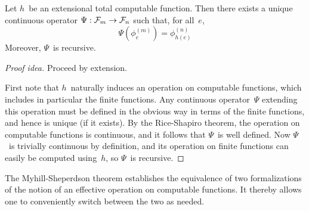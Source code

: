 \begin{thm}
Let \(h\)~be an extensional total computable function. Then there exists a unique continuous operator \(\Psi:\mathcal{F}_m\to\mathcal{F}_n\) such that, for all~\(e\),
\[\Psi(\phi_e^{(m)})=\phi_{h(e)}^{(n)}\]
Moreover, \(\Psi\)~is recursive.
\end{thm}
\begin{proof}[Proof idea]
Proceed by extension.

First note that \(h\)~naturally induces an operation on computable functions, which includes in particular the finite functions. Any continuous operator~\(\Psi\) extending this operation must be defined in the obvious way in terms of the finite functions, and hence is unique (if it exists). By the Rice-Shapiro theorem, the operation on computable functions is continuous, and it follows that \(\Psi\)~is well defined. Now \(\Psi\)~is trivially continuous by definition, and its operation on finite functions can easily be computed using~\(h\), so \(\Psi\)~is recursive.
\end{proof}
\begin{app}
The Myhill-Sheperdson theorem establishes the equivalence of two formalizations of the notion of an effective operation on computable functions. It thereby allows one to conveniently switch between the two as needed.
\end{app}

